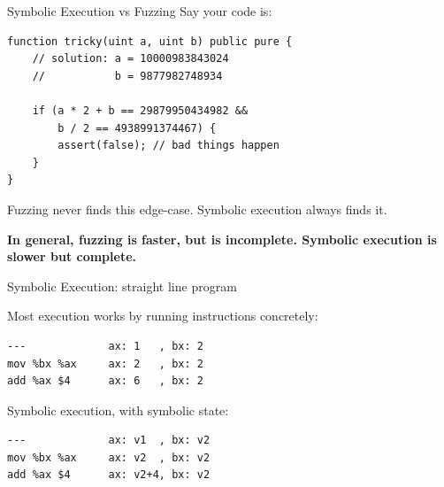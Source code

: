 \documentclass[aspectratio=169]{beamer}
\begin{document}

\begin{frame}[fragile=singleslide]{Symbolic Execution vs Fuzzing}
Say your code is:

\begin{Verbatim}[frame=single, framerule=0.2mm, framesep=2mm,fontsize=\small]
function tricky(uint a, uint b) public pure {
	// solution: a = 10000983843024
	//           b = 9877982748934
	
	if (a * 2 + b == 29879950434982 &&
	    b / 2 == 4938991374467) {
		assert(false); // bad things happen
	}
}
\end{Verbatim}

Fuzzing never finds this edge-case. Symbolic execution always finds it.
\bigskip 

\textbf{In general, fuzzing is faster, but is incomplete. Symbolic execution is slower but complete.}

\end{frame}



\begin{frame}[fragile=singleslide]{Symbolic Execution: straight line program}

Most execution works by running instructions concretely:
\begin{verbatim}
---             ax: 1   , bx: 2
mov %bx %ax     ax: 2   , bx: 2
add %ax $4      ax: 6   , bx: 2
\end{verbatim}
\bigskip

Symbolic execution, with symbolic state:
\begin{verbatim}
---             ax: v1  , bx: v2
mov %bx %ax     ax: v2  , bx: v2
add %ax $4      ax: v2+4, bx: v2
\end{verbatim}
\end{frame}
\end{document}

